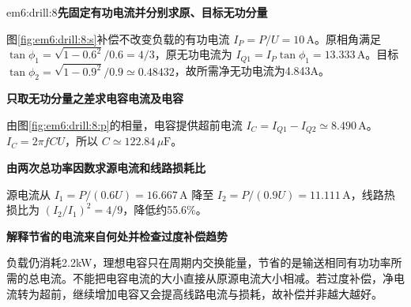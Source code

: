 \begin{drillsolution}{em6:drill:8}\textbf{先固定有功电流并分别求原、目标无功分量}\par\nobreak
图\ref{fig:em6:drill:8:s}补偿不改变负载的有功电流 $I_P=P/U=10\,\mathrm A$。原相角满足 $\tan\phi_1=\sqrt{1-0.6^2}/0.6=4/3$，原无功电流为 $I_{Q1}=I_P\tan\phi_1=13.333\,\mathrm A$。目标 $\tan\phi_2=\sqrt{1-0.9^2}/0.9\simeq0.48432$，故所需净无功电流为4.843A。



\par\medskip{}\noindent\textbf{只取无功分量之差求电容电流及电容}\par\nobreak
由图\ref{fig:em6:drill:8:p}的相量，电容提供超前电流 $I_C=I_{Q1}-I_{Q2}\simeq8.490\,\mathrm A$。$I_C=2\pi fCU$，所以 $C\simeq122.84\,\mu\mathrm F$。

\par\medskip{}\noindent\textbf{由两次总功率因数求源电流和线路损耗比}\par\nobreak
源电流从 $I_1=P/(0.6U)=16.667\,\mathrm A$ 降至 $I_2=P/(0.9U)=11.111\,\mathrm A$，线路热损比为 $(I_2/I_1)^2=4/9$，降低约55.6\%。



\par\medskip{}\noindent\textbf{解释节省的电流来自何处并检查过度补偿趋势}\par\nobreak
负载仍消耗2.2kW，理想电容只在周期内交换能量，节省的是输送相同有功功率所需的总电流。不能把电容电流的大小直接从原源电流大小相减。若过度补偿，净电流转为超前，继续增加电容又会提高线路电流与损耗，故补偿并非越大越好。\end{drillsolution}
